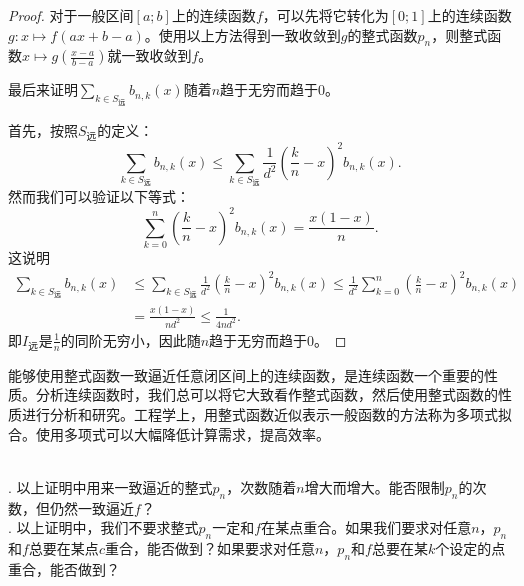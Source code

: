\documentclass[12pt,UTF8]{ctexbook}
\begin{document}
\begin{appendix}
\begin{proof}
    对于一般区间$[a;b]$上的连续函数$f$，可以先将它转化为$[0;1]$上的连续函数$g: x\mapsto f(ax + b - a)$。使用以上方法得到一致收敛到$g$的整式函数$p_n$，则整式函数$x\mapsto g\left(\frac{x - a}{b - a}\right) $就一致收敛到$f$。

    最后来证明$ \sum_{k\in S_{\text{远}}} b_{n,k}(x) $随着$n$趋于无穷而趋于$0$。

    首先，按照$S_{\text{远}}$的定义：
    $$ \sum_{k\in S_{\text{远}}} b_{n,k}(x) \leqslant \sum_{k\in S_{\text{远}}}  \frac{1}{d^2}\left(\frac{k}{n} - x\right)^2 b_{n,k}(x). $$
    然而我们可以验证以下等式：
    $$ \sum_{k=0}^n \left(\frac{k}{n} - x\right)^2 b_{n,k}(x) = \frac{x(1 - x)}{n}. $$
    这说明
    \begin{align*}
        \sum_{k\in S_{\text{远}}} b_{n,k}(x) &\leqslant \sum_{k\in S_{\text{远}}}  \frac{1}{d^2}\left(\frac{k}{n} - x\right)^2 b_{n,k}(x) \leqslant \frac{1}{d^2} \sum_{k=0}^n \left(\frac{k}{n} - x\right)^2 b_{n,k}(x) \\
        &= \frac{x(1 - x)}{nd^2} \leqslant \frac{1}{4nd^2}.
    \end{align*}
    即$I_{\text{远}}$是$\frac{1}{n}$的同阶无穷小，因此随$n$趋于无穷而趋于$0$。
    
\end{proof}

能够使用整式函数一致逼近任意闭区间上的连续函数，是连续函数一个重要的性质。分析连续函数时，我们总可以将它大致看作整式函数，然后使用整式函数的性质进行分析和研究。工程学上，用整式函数近似表示一般函数的方法称为多项式拟合。使用多项式可以大幅降低计算需求，提高效率。

\begin{sk}
    \mbox{} \\
    . 以上证明中用来一致逼近的整式$p_n$，次数随着$n$增大而增大。能否限制$p_n$的次数，但仍然一致逼近$f$？\\
    . 以上证明中，我们不要求整式$p_n$一定和$f$在某点重合。如果我们要求对任意$n$，$p_n$和$f$总要在某点$c$重合，能否做到？如果要求对任意$n$，$p_n$和$f$总要在某$k$个设定的点重合，能否做到？
\end{sk}


\end{appendix}
\end{document}
